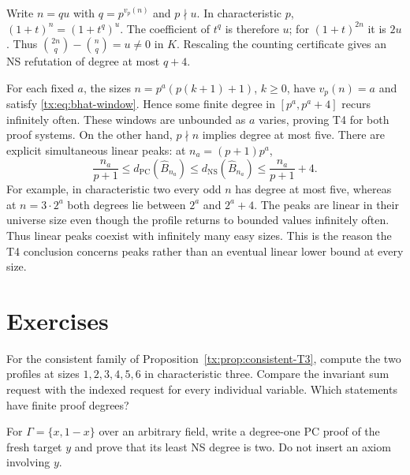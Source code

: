Write $n=qu$ with $q=p^{v_p(n)}$ and $p\nmid u$. In characteristic
$p$, $(1+t)^n=(1+t^q)^u$. The coefficient of $t^q$ is therefore $u$;
for $(1+t)^{2n}$ it is $2u$. Thus
$\binom{2n}q-\binom nq=u\ne0$ in $K$. Rescaling the counting
certificate gives an NS refutation of degree at most $q+4$.

For each fixed $a$, the sizes $n=p^a(p(k+1)+1)$, $k\geq0$, have
$v_p(n)=a$ and satisfy \eqref{tx:eq:bhat-window}. Hence some finite degree in
$[p^a,p^a+4]$ recurs infinitely often. These windows are unbounded as $a$
varies, proving T4 for both proof systems. On the other hand, $p\nmid n$
implies degree at most five. There are explicit simultaneous linear peaks:
at $n_a=(p+1)p^a$,
\[
 \frac{n_a}{p+1}\leq d_{\mathrm{PC}}(\widehat B_{n_a})
 \leq d_{\mathrm{NS}}(\widehat B_{n_a})
 \leq\frac{n_a}{p+1}+4.
\]
For example, in characteristic two every odd $n$ has degree at most
five, whereas at $n=3\cdot2^a$ both degrees lie between $2^a$ and
$2^a+4$. The peaks are linear in their universe size even though the
profile returns to bounded values infinitely often.
Thus linear peaks coexist with infinitely many easy sizes. This is the
reason the T4 conclusion concerns peaks rather than an eventual linear
lower bound at every size.

\section{Exercises}
\begin{exercise}\label{tx:ex:sum-versus-individual}
For the consistent family of Proposition~\ref{tx:prop:consistent-T3},
compute the two profiles at sizes $1,2,3,4,5,6$ in characteristic three.
Compare the invariant sum request with the indexed request for every
individual variable. Which statements have finite proof degrees?
\end{exercise}
\par\medskip

\begin{exercise}\label{tx:ex:fresh-small}
For $\Gamma=\{x,1-x\}$ over an arbitrary field, write a degree-one PC
proof of the fresh target $y$ and prove that its least NS degree is two.
Do not insert an axiom involving $y$.
\end{exercise}
\par\medskip


